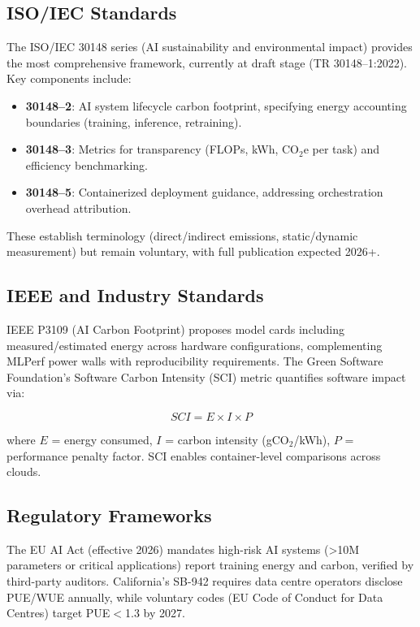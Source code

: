 \subsection{ISO/IEC Standards}

The ISO/IEC 30148 series (AI sustainability and environmental impact) provides the most comprehensive framework, currently at draft stage (TR 30148--1:2022). Key components include:
\begin{itemize}
    \item \textbf{30148--2}: AI system lifecycle carbon footprint, specifying energy accounting boundaries (training, inference, retraining).
    \item \textbf{30148--3}: Metrics for transparency (FLOPs, kWh, CO$_2$e per task) and efficiency benchmarking.
    \item \textbf{30148--5}: Containerized deployment guidance, addressing orchestration overhead attribution.
\end{itemize}

These establish terminology (direct/indirect emissions, static/dynamic measurement) but remain voluntary, with full publication expected 2026+.

\subsection{IEEE and Industry Standards}

IEEE P3109 (AI Carbon Footprint) proposes model cards including measured/estimated energy across hardware configurations, complementing MLPerf power walls with reproducibility requirements. The Green Software Foundation's Software Carbon Intensity (SCI) metric quantifies software impact via:

\[SCI = E \times I \times P\]

where $E$ = energy consumed, $I$ = carbon intensity (gCO$_2$/kWh), $P$ = performance penalty factor. SCI enables container-level comparisons across clouds.

\subsection{Regulatory Frameworks}

The EU AI Act (effective 2026) mandates high-risk AI systems (>10M parameters or critical applications) report training energy and carbon, verified by third-party auditors. California's SB-942 requires data centre operators disclose PUE/WUE annually, while voluntary codes (EU Code of Conduct for Data Centres) target PUE$<$1.3 by 2027.

